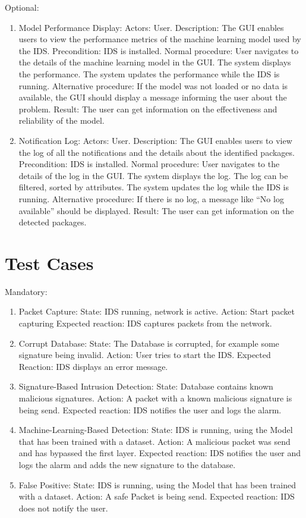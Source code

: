 \documentclass[oneside, english]{reports/assets/sdqtechreport}
\begin{document}
Optional:

\begin{enumerate}
	\item Model Performance Display: Actors: User. Description: The GUI enables users to
	      view the performance metrics of the machine learning model used by the IDS.
	      Precondition: IDS is installed. Normal procedure: User navigates to the details
	      of the machine learning model in the GUI. The system displays the performance.
	      The system updates the performance while the IDS is running. Alternative
	      procedure: If the model was not loaded or no data is available, the GUI should
	      display a message informing the user about the problem. Result: The user can
	      get information on the effectiveness and reliability of the model.
	\item Notification Log: Actors: User. Description: The GUI enables users to view the
	      log of all the notifications and the details about the identified packages.
	      Precondition: IDS is installed. Normal procedure: User navigates to the details
	      of the log in the GUI. The system displays the log. The log can be filtered,
	      sorted by attributes. The system updates the log while the IDS is running.
	      Alternative procedure: If there is no log, a message like “No log available”
	      should be displayed. Result: The user can get information on the detected
	      packages.
\end{enumerate}

\chapter{Test Cases}
\label{chap:TestCases}

Mandatory:

\begin{enumerate}
	\item Packet Capture: State: IDS running, network is active. Action: Start packet
	      capturing Expected reaction: IDS captures packets from the network.
	\item Corrupt Database: State: The Database is corrupted, for example some signature
	      being invalid. Action: User tries to start the IDS. Expected Reaction: IDS
	      displays an error message.
	\item Signature-Based Intrusion Detection: State: Database contains known malicious
	      signatures. Action: A packet with a known malicious signature is being send.
	      Expected reaction: IDS notifies the user and logs the alarm.
	\item Machine-Learning-Based Detection: State: IDS is running, using the Model that
	      has been trained with a dataset. Action: A malicious packet was send and has
	      bypassed the first layer. Expected reaction: IDS notifies the user and logs the
	      alarm and adds the new signature to the database.
	\item False Positive: State: IDS is running, using the Model that has been trained
	      with a dataset. Action: A safe Packet is being send. Expected reaction: IDS
	      does not notify the user.
\end{enumerate}
\end{document}
